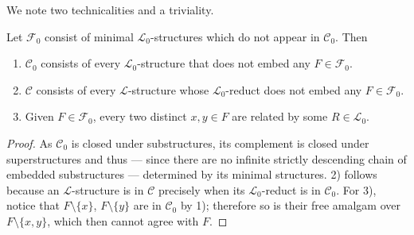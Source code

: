 We note two technicalities and a triviality.

\begin{lemma}\label{lem:free-forb}
    Let $\mathcal{F}_0$ consist of minimal $\mathcal{L}_0$-structures which do not appear in $\mathcal{C}_0$.
    Then
    \begin{enumerate}
        \item $\mathcal{C}_0$ consists of every $\mathcal{L}_0$-structure that does not embed any $F \in \mathcal{F}_0$.
        \item $\mathcal{C}$ consists of every $\mathcal{L}$-structure whose $\mathcal{L}_0$-reduct does not embed any $F \in \mathcal{F}_0$.
        \item Given $F \in \mathcal{F}_0$, every two distinct $x, y \in F$ are related by some $R \in \mathcal{L}_0$.
    \end{enumerate}
\end{lemma}
\begin{proof}
    As $\mathcal{C}_0$ is closed under substructures, its complement is closed under superstructures and thus 
    --- since there are no infinite strictly descending chain of embedded substructures 
    --- determined by its minimal structures.
    2) follows because an $\mathcal{L}$-structure is in $\mathcal{C}$ precisely when its $\mathcal{L}_0$-reduct is in $\mathcal{C}_0$.
    For 3), notice that $F \setminus \{x\}$, $F \setminus \{y\}$ are in $\mathcal{C}_0$ by 1); 
    therefore so is their free amalgam over $F \setminus \{x, y\}$, which then cannot agree with $F$.
\end{proof}

